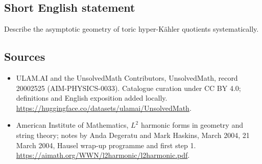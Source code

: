 \documentclass[11pt]{article}
\begin{document}
\subsection{Short English statement}
Describe the asymptotic geometry of toric hyper-Kähler quotients systematically.
\subsection{Sources}
\begin{itemize}
\item[\hypertarget{source:20002525:1}{S1}] ULAM.AI and the UnsolvedMath Contributors, UnsolvedMath, record 20002525 (AIM-PHYSICS-0033). Catalogue curation under CC BY 4.0; definitions and English exposition added locally.
\url{https://huggingface.co/datasets/ulamai/UnsolvedMath}.
\item[\hypertarget{source:20002525:2}{S2}] American Institute of Mathematics, $L^2$ harmonic forms in geometry and string theory; notes by Anda Degeratu and Mark Haskins, March 2004, 21 March 2004, Hausel wrap-up programme and first step 1.
\url{https://aimath.org/WWN/l2harmonic/l2harmonic.pdf}.
\end{itemize}
\label{end:20002525}
\end{document}

